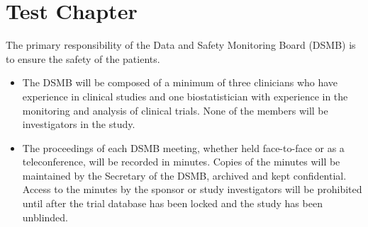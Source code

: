 %



\chapter{Test Chapter}
\minitoc
{}


The primary responsibility of the Data and Safety Monitoring Board (DSMB) is to ensure the safety of the patients.
\begin{itemize}
	\item The DSMB will be composed of a minimum of three clinicians who have experience in clinical studies  and one biostatistician with experience in the monitoring and analysis of clinical trials.  None of the members will be investigators in the study.
	\item The proceedings of each DSMB meeting, whether held face-to-face or as a teleconference, will be recorded in minutes.  Copies of the minutes will be maintained by the Secretary of the DSMB, archived and kept confidential.  Access to the minutes by the sponsor or study investigators will be prohibited until after the trial database has been locked and the study has been unblinded.
\end{itemize}